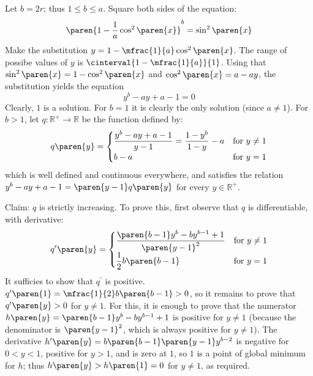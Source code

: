 Let $b = 2r$; thus $1 \leq b \leq a$.
Square both sides of the equation:
\begin{equation*}
\paren{1 - \frac{1}{a} \cos^2\paren{x}}^{b} = \sin^2\paren{x}
\end{equation*}
Make the substitution $y = 1 - \mfrac{1}{a} \cos^2\paren{x}$.
The range of possibe values of $y$ is $\cinterval{1 - \mfrac{1}{a}}{1}$.
\newline
Using that $\sin^2\paren{x} = 1 - \cos^2\paren{x}$ and $\cos^2\paren{x} = a - a y$,
the substitution yields the equation
\begin{equation*}
y^b - a y + a - 1 = 0
\end{equation*}
Clearly, $1$ is a solution.
For $b = 1$ it is clearly the only solution (since $a \neq 1$).
For $b>1$, let $q : \mathbb{R}^{+} \to \mathbb{R}$ be the function defined by:
\begin{equation*}
 q\paren{y} =
 \begin{cases}
  \dfrac{y^b - a y + a - 1}{y - 1} =
  \dfrac{1 - y^b}{1 - y} - a
  &\text{for $y \neq 1$} \\
  b - a &\text{for $y = 1$}
 \end{cases}
\end{equation*}
which is well defined and continuous everywhere,
and satisfies the relation $y^b - a y + a - 1= \paren{y - 1} q\paren{y}$
for every $y \in \mathbb{R}^{+}$.

Claim: $q$ is strictly increasing. \newline
To prove this, first observe that $q$ is differentiable, with derivative:
\begin{equation*}
 q^{\prime}\paren{y} =
 \begin{cases}
  \dfrac{\paren{b-1} y^b - b y^{b-1} + 1}{\paren{y - 1}^2}
  &\text{for $y \neq 1$} \\
  \dfrac{1}{2} b \paren{b - 1} &\text{for $y = 1$}
 \end{cases}
\end{equation*}
It sufficies to show that $q^{\prime}$ is positive.
$q^{\prime}\paren{1} = \mfrac{1}{2} b \paren{b-1} > 0$,
so it remains to prove that $q^{\prime}\paren{y} > 0$ for $y \neq 1$.
For this, it is enough to prove that the numerator
$h\paren{y} = \paren{b-1} y^b - b y^{b-1} + 1$ is positive for $y \neq 1$
(because the denominator is $\paren{y - 1}^2$,
which is always positive for $y \neq 1$). \newline
The derivative $h^{\prime}\paren{y} = b\paren{b-1}\paren{y-1}y^{b-2}$
is negative for $0 < y < 1$,
positive for $y > 1$,
and is zero at $1$,
so $1$ is a point of global minimum for $h$;
thus $h\paren{y} > h\paren{1} = 0$ for $y \neq 1$, as required.

